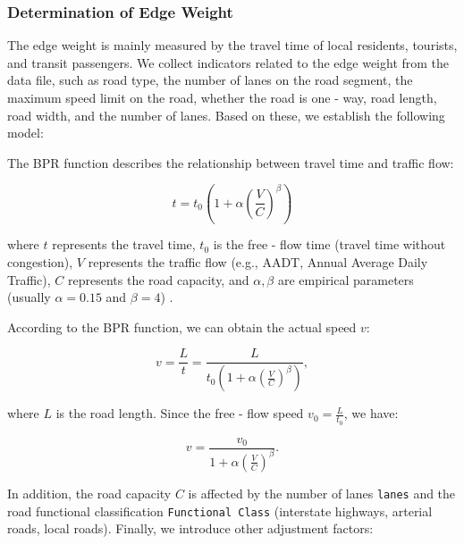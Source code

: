 \documentclass{mcmthesis}
\begin{document}
\subsubsection{Determination of Edge Weight}

The edge weight is mainly measured by the travel time of local residents, tourists, and transit passengers. We collect indicators related to the edge weight from the data file, such as road type, the number of lanes on the road segment, the maximum speed limit on the road, whether the road is one - way, road length, road width, and the number of lanes. Based on these, we establish the following model:

The BPR function describes the relationship between travel time and traffic flow:

\begin{equation}
t = t_0 \left(1 + \alpha \left(\frac{V}{C}\right)^\beta\right)
\end{equation}

where \(t\) represents the travel time, \(t_0\) is the free - flow time (travel time without congestion), \(V\) represents the traffic flow (e.g., AADT, Annual Average Daily Traffic), \(C\) represents the road capacity, and \(\alpha, \beta\) are empirical parameters (usually \(\alpha = 0.15\) and \(\beta = 4\)) \cite{hamdouch2014} \cite{gao2004}.

According to the BPR function, we can obtain the actual speed \(v\):

\begin{equation}
v = \frac{L}{t} = \frac{L}{t_0 \left(1 + \alpha \left(\frac{V}{C}\right)^\beta\right)},
\end{equation}

where \(L\) is the road length. Since the free - flow speed \(v_0=\frac{L}{t_0}\), we have:

\begin{equation}
v = \frac{v_0}{1 + \alpha \left(\frac{V}{C}\right)^\beta}.
\end{equation}

In addition, the road capacity \(C\) is affected by the number of lanes \texttt{lanes} and the road functional classification \texttt{Functional Class} (interstate highways, arterial roads, local roads). Finally, we introduce other adjustment factors:
\end{document}
